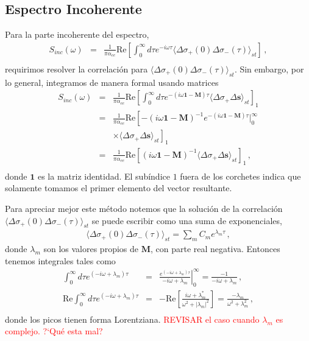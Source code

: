 \documentclass[twocolumn,aps,eqsecnum]{revtex4}
\begin{document}
\subsection{Espectro Incoherente} 
Para la parte incoherente del espectro, 
%
\begin{eqnarray} 	%
S_{inc}(\omega) 
&=& \frac{1}{ \pi \alpha_{ee} } \mathrm{Re} \left[  \int_0^{\infty} 
	d\tau e^{-i \omega \tau} 	
	\langle \Delta \sigma_+ (0 )\Delta \sigma_- (\tau) \rangle_{st} \right] \,,  
	\nonumber \\ 
\end{eqnarray}
requirimos resolver la correlaci\'on para 
$\langle \Delta \sigma_+(0) \Delta \sigma_-(\tau) \rangle_{st}$. Sin 
embargo, por lo general, integramos de manera formal usando matrices
%
\begin{eqnarray} 	%
S_{inc}(\omega) 
&=& \frac{1}{ \pi \alpha_{ee}  } \mathrm{Re} \left[  \int_0^{\infty} 
	d\tau e^{-(i \omega \mathbf{1} -\mathbf{M}) \tau} 	
	\langle \Delta \sigma_+ \Delta \mathbf{s} \rangle_{st} \right]_1   
	\nonumber \\ 
&=& \frac{1}{ \pi \alpha_{ee}  } \mathrm{Re} \left[ 
	-(i \omega \mathbf{1} -\mathbf{M})^{-1} 
	e^{-(i \omega \mathbf{1} -\mathbf{M}) \tau} \left. \right|_0^{\infty}  
	 \right. 	\nonumber \\
&&	\left. \times 
	\langle \Delta \sigma_+ \Delta \mathbf{s} \rangle_{st} \right]_1 	
	\nonumber \\ 
&=& \frac{1}{ \pi \alpha_{ee}  } \mathrm{Re} \left[ 
	(i \omega \mathbf{1} -\mathbf{M})^{-1} 
	\langle \Delta \sigma_+ \Delta \mathbf{s} \rangle_{st} \right]_1 	\,, 	
	\nonumber \\ 
\end{eqnarray}
donde $\mathbf{1}$ es la matriz identidad. El sub\'indice $1$ fuera de los 
corchetes indica que solamente tomamos el primer elemento del vector 
resultante. 

Para apreciar mejor este m\'etodo notemos que la soluci\'on de la 
correlaci\'on $\langle \Delta \sigma_+ (0 )\Delta \sigma_- (\tau) \rangle_{st}$ 
se puede escribir como una suma de exponenciales, 
%
\begin{eqnarray}
\langle \Delta \sigma_+(0) \Delta \sigma_-(\tau) \rangle_{st} 
	= \sum_m C_m e^{\lambda_m \tau} \,, 
\end{eqnarray}
donde $\lambda_m$ son los valores propios de $\mathbf{M}$, con parte 
real negativa. Entonces tenemos integrales tales como 
%
\begin{eqnarray} 	%
\int_0^{\infty} d\tau e^{(-i \omega +\lambda_m) \tau} 
	&=& \left. \frac{e^{(-i \omega +\lambda_m) \tau}}
	{-i \omega +\lambda_m} \right|_0^{\infty} 
	= \frac{-1}{-i \omega +\lambda_m} 	\,, \nonumber 	\\ 
\mathrm{Re} \int_0^{\infty} d\tau e^{(-i \omega +\lambda_m) \tau} 
	&=& - \mathrm{Re} \left[ \frac{i \omega +\lambda_m^\ast}
	{ \omega^2 +|\lambda_m|^2} \right] 
	= \frac{- \lambda_m}{ \omega^2 +\lambda_m^2} \,, \nonumber \\
\end{eqnarray}
donde los picos tienen forma Lorentziana. \textcolor{red}{REVISAR el caso 
cuando $\lambda_m$ es complejo. ?`Qu\'e esta mal?}
\end{document}
